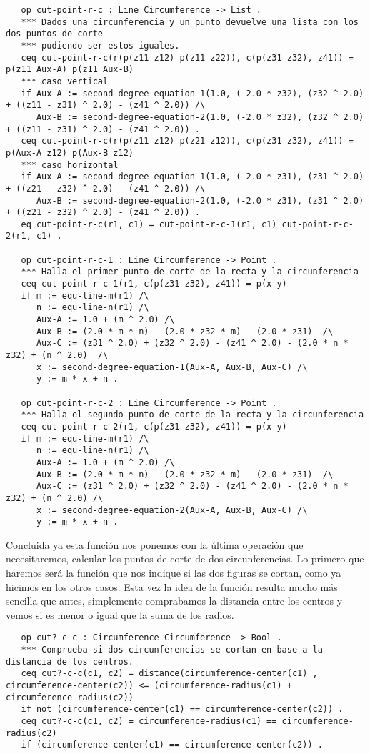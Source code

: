 {{\codesize
\begin{verbatim}
   op cut-point-r-c : Line Circumference -> List .
   *** Dados una circunferencia y un punto devuelve una lista con los dos puntos de corte
   *** pudiendo ser estos iguales.
   ceq cut-point-r-c(r(p(z11 z12) p(z11 z22)), c(p(z31 z32), z41)) = p(z11 Aux-A) p(z11 Aux-B)
   *** caso vertical 
   if Aux-A := second-degree-equation-1(1.0, (-2.0 * z32), (z32 ^ 2.0) + ((z11 - z31) ^ 2.0) - (z41 ^ 2.0)) /\
      Aux-B := second-degree-equation-2(1.0, (-2.0 * z32), (z32 ^ 2.0) + ((z11 - z31) ^ 2.0) - (z41 ^ 2.0)) .
   ceq cut-point-r-c(r(p(z11 z12) p(z21 z12)), c(p(z31 z32), z41)) = p(Aux-A z12) p(Aux-B z12)
   *** caso horizontal
   if Aux-A := second-degree-equation-1(1.0, (-2.0 * z31), (z31 ^ 2.0) + ((z21 - z32) ^ 2.0) - (z41 ^ 2.0)) /\
      Aux-B := second-degree-equation-2(1.0, (-2.0 * z31), (z31 ^ 2.0) + ((z21 - z32) ^ 2.0) - (z41 ^ 2.0)) .
   eq cut-point-r-c(r1, c1) = cut-point-r-c-1(r1, c1) cut-point-r-c-2(r1, c1) .

   op cut-point-r-c-1 : Line Circumference -> Point .
   *** Halla el primer punto de corte de la recta y la circunferencia
   ceq cut-point-r-c-1(r1, c(p(z31 z32), z41)) = p(x y)
   if m := equ-line-m(r1) /\
      n := equ-line-n(r1) /\
      Aux-A := 1.0 + (m ^ 2.0) /\
      Aux-B := (2.0 * m * n) - (2.0 * z32 * m) - (2.0 * z31)  /\
      Aux-C := (z31 ^ 2.0) + (z32 ^ 2.0) - (z41 ^ 2.0) - (2.0 * n * z32) + (n ^ 2.0)  /\
      x := second-degree-equation-1(Aux-A, Aux-B, Aux-C) /\
      y := m * x + n .

   op cut-point-r-c-2 : Line Circumference -> Point .
   *** Halla el segundo punto de corte de la recta y la circunferencia
   ceq cut-point-r-c-2(r1, c(p(z31 z32), z41)) = p(x y)
   if m := equ-line-m(r1) /\
      n := equ-line-n(r1) /\
      Aux-A := 1.0 + (m ^ 2.0) /\
      Aux-B := (2.0 * m * n) - (2.0 * z32 * m) - (2.0 * z31)  /\
      Aux-C := (z31 ^ 2.0) + (z32 ^ 2.0) - (z41 ^ 2.0) - (2.0 * n * z32) + (n ^ 2.0) /\
      x := second-degree-equation-2(Aux-A, Aux-B, Aux-C) /\
      y := m * x + n .

\end{verbatim}
}

Concluida ya esta función nos ponemos con la última operación que necesitaremos, calcular los puntos de corte de dos circunferencias. Lo primero que haremos será la función que nos indique si las dos figuras se cortan, como ya hicimos en los otros casos. Esta vez la idea de la función resulta mucho más sencilla que antes, simplemente comprabamos la distancia entre los centros y vemos si es menor o igual que la suma de los radios. \par
{\codesize
\begin{verbatim}
   op cut?-c-c : Circumference Circumference -> Bool .
   *** Comprueba si dos circunferencias se cortan en base a la distancia de los centros.
   ceq cut?-c-c(c1, c2) = distance(circumference-center(c1) , circumference-center(c2)) <= (circumference-radius(c1) + circumference-radius(c2))
   if not (circumference-center(c1) == circumference-center(c2)) . 
   ceq cut?-c-c(c1, c2) = circumference-radius(c1) == circumference-radius(c2)
   if (circumference-center(c1) == circumference-center(c2)) .
\end{verbatim}
}

}
